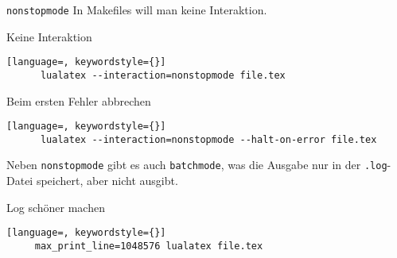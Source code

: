 \begin{frame}[fragile]{\texttt{nonstopmode}}
  In Makefiles will man keine Interaktion.

  \begin{block}{Keine Interaktion}
    \begin{lstlisting}[language=, keywordstyle={}]
      lualatex --interaction=nonstopmode file.tex
    \end{lstlisting}
  \end{block}

  \begin{block}{Beim ersten Fehler abbrechen}
    \begin{lstlisting}[language=, keywordstyle={}]
      lualatex --interaction=nonstopmode --halt-on-error file.tex
    \end{lstlisting}
  \end{block}

  Neben \texttt{nonstopmode} gibt es auch \texttt{batchmode}, was die Ausgabe nur in der \texttt{.log}-Datei speichert, aber nicht ausgibt.

  \begin{block}{Log schöner machen}
    \begin{lstlisting}[language=, keywordstyle={}]
     max_print_line=1048576 lualatex file.tex
    \end{lstlisting}
  \end{block}
\end{frame}
